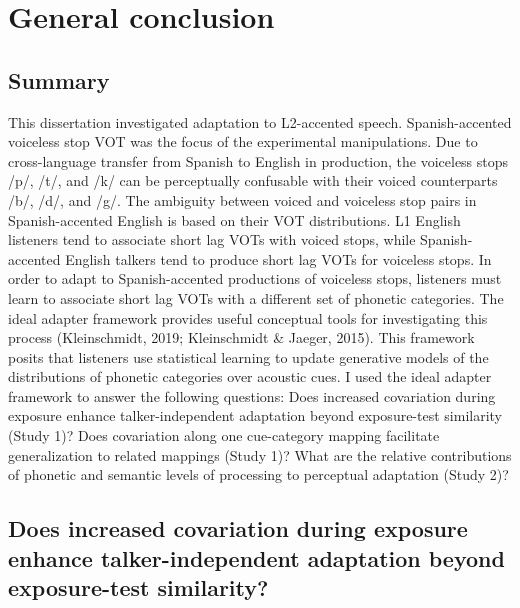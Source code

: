 \documentclass[
  12pt,
  twoside]{article}
\begin{document}
\newpage

\hypertarget{general-conclusion}{%
\section{General conclusion}\label{general-conclusion}}

\hypertarget{summary-2}{%
\subsection{Summary}\label{summary-2}}

This dissertation investigated adaptation to L2-accented speech.
Spanish-accented voiceless stop VOT was the focus of the experimental manipulations.
Due to cross-language transfer from Spanish to English in production, the voiceless stops /p/, /t/, and /k/ can be perceptually confusable with their voiced counterparts /b/, /d/, and /g/.
The ambiguity between voiced and voiceless stop pairs in Spanish-accented English is based on their VOT distributions.
L1 English listeners tend to associate short lag VOTs with voiced stops, while Spanish-accented English talkers tend to produce short lag VOTs for voiceless stops.
In order to adapt to Spanish-accented productions of voiceless stops, listeners must learn to associate short lag VOTs with a different set of phonetic categories.
The ideal adapter framework provides useful conceptual tools for investigating this process (Kleinschmidt, 2019; Kleinschmidt \& Jaeger, 2015).
This framework posits that listeners use statistical learning to update generative models of the distributions of phonetic categories over acoustic cues.
I used the ideal adapter framework to answer the following questions: Does increased covariation during exposure enhance talker-independent adaptation beyond exposure-test similarity (Study 1)? Does covariation along one cue-category mapping facilitate generalization to related mappings (Study 1)? What are the relative contributions of phonetic and semantic levels of processing to perceptual adaptation (Study 2)?

\hypertarget{does-increased-covariation-during-exposure-enhance-talker-independent-adaptation-beyond-exposure-test-similarity}{%
\subsection{Does increased covariation during exposure enhance talker-independent adaptation beyond exposure-test similarity?}\label{does-increased-covariation-during-exposure-enhance-talker-independent-adaptation-beyond-exposure-test-similarity}}
\end{document}
